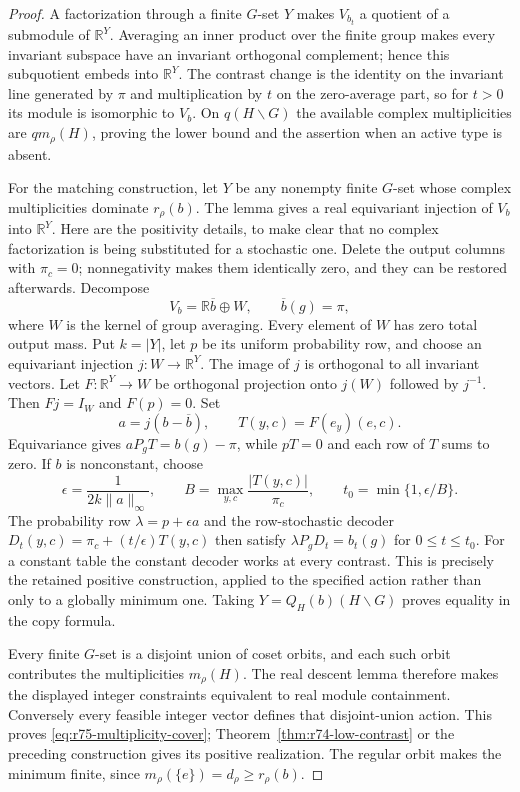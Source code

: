 \begin{proof}
A factorization through a finite $G$-set $Y$ makes $V_{b_t}$ a quotient
of a submodule of $\mathbb R^Y$. Averaging an inner product over the
finite group makes every invariant subspace have an invariant orthogonal
complement; hence this subquotient embeds into $\mathbb R^Y$. The
contrast change is the identity on the invariant line generated by
$\pi$ and multiplication by $t$ on the zero-average part, so for $t>0$
its module is isomorphic to $V_b$. On $q(H\backslash G)$ the available
complex multiplicities are $qm_\rho(H)$, proving the lower bound and
the assertion when an active type is absent.

For the matching construction, let $Y$ be any nonempty finite $G$-set
whose complex multiplicities dominate $r_\rho(b)$. The lemma gives a
real equivariant injection of $V_b$ into $\mathbb R^Y$. Here are the
positivity details, to make clear that no complex factorization is
being substituted for a stochastic one. Delete the output columns
with $\pi_c=0$; nonnegativity makes them identically zero, and they can
be restored afterwards. Decompose
\[
 V_b=\mathbb R\overline b\oplus W,\qquad
 \overline b(g)=\pi,
\]
where $W$ is the kernel of group averaging. Every element of $W$ has
zero total output mass. Put $k=|Y|$, let $p$ be its uniform probability
row, and choose an equivariant injection $j:W\to\mathbb R^Y$.
The image of $j$ is orthogonal to all invariant vectors. Let
$F:\mathbb R^Y\to W$ be orthogonal projection onto $j(W)$ followed by
$j^{-1}$. Then $Fj=I_W$ and $F(p)=0$. Set
\[
 a=j(b-\overline b),\qquad T(y,c)=F(e_y)(e,c).
\]
Equivariance gives $aP_gT=b(g)-\pi$, while $pT=0$ and each row of $T$
sums to zero. If $b$ is nonconstant, choose
\[
 \epsilon=\frac1{2k\|a\|_\infty},\qquad
 B=\max_{y,c}\frac{|T(y,c)|}{\pi_c},\qquad
 t_0=\min\{1,\epsilon/B\}.
\]
The probability row $\lambda=p+\epsilon a$ and the row-stochastic
decoder $D_t(y,c)=\pi_c+(t/\epsilon)T(y,c)$ then satisfy
$\lambda P_gD_t=b_t(g)$ for $0\le t\le t_0$. For a constant table the
constant decoder works at every contrast. This is precisely the
retained positive construction, applied to the specified action
rather than only to a globally minimum one. Taking
$Y=Q_H(b)(H\backslash G)$ proves equality in the copy formula.

Every finite $G$-set is a disjoint union of coset orbits, and each such
orbit contributes the multiplicities $m_\rho(H)$. The real descent
lemma therefore makes the displayed integer constraints equivalent to
real module containment. Conversely every feasible integer vector
defines that disjoint-union action. This proves
\eqref{eq:r75-multiplicity-cover}; Theorem~\ref{thm:r74-low-contrast}
or the preceding construction gives its positive realization. The
regular orbit makes the minimum finite, since
$m_\rho(\{e\})=d_\rho\ge r_\rho(b)$.
\end{proof}

